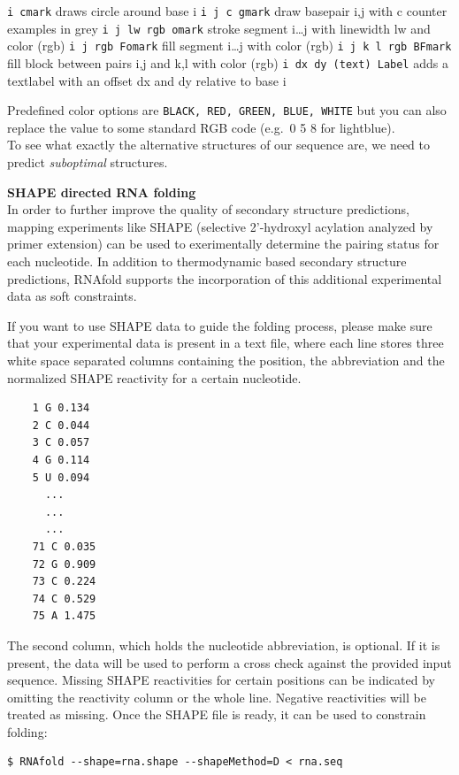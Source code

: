 \documentclass[]{article}
\begin{document}
\texttt{i\ cmark} draws circle around base i \texttt{i\ j\ c\ gmark}
draw basepair i,j with c counter examples in grey
\texttt{i\ j\ lw\ rgb\ omark} stroke segment i\ldots{}j with linewidth
lw and color (rgb) \texttt{i\ j\ rgb\ Fomark} fill segment i\ldots{}j
with color (rgb) \texttt{i\ j\ k\ l\ rgb\ BFmark} fill block between
pairs i,j and k,l with color (rgb) \texttt{i\ dx\ dy\ (text)\ Label}
adds a textlabel with an offset dx and dy relative to base i

Predefined color options are \texttt{BLACK,\ RED,\ GREEN,\ BLUE,\ WHITE}
but you can also replace the value to some standard RGB code (e.g.~0 5 8
for lightblue).\\
 To see what exactly the alternative structures of our sequence are, we
need to predict \emph{suboptimal} structures.

\textbf{SHAPE directed RNA folding}\\
In order to further improve the quality of secondary structure
predictions, mapping experiments like SHAPE (selective 2'-hydroxyl
acylation analyzed by primer extension) can be used to exerimentally
determine the pairing status for each nucleotide. In addition to
thermodynamic based secondary structure predictions, RNAfold supports
the incorporation of this additional experimental data as soft
constraints.

If you want to use SHAPE data to guide the folding process, please make
sure that your experimental data is present in a text file, where each
line stores three white space separated columns containing the position,
the abbreviation and the normalized SHAPE reactivity for a certain
nucleotide.

\begin{verbatim}
    1 G 0.134
    2 C 0.044
    3 C 0.057
    4 G 0.114
    5 U 0.094
      ...
      ...
      ...
    71 C 0.035
    72 G 0.909
    73 C 0.224
    74 C 0.529
    75 A 1.475
\end{verbatim}

The second column, which holds the nucleotide abbreviation, is optional.
If it is present, the data will be used to perform a cross check against
the provided input sequence. Missing SHAPE reactivities for certain
positions can be indicated by omitting the reactivity column or the
whole line. Negative reactivities will be treated as missing. Once the
SHAPE file is ready, it can be used to constrain folding:

\begin{verbatim}
$ RNAfold --shape=rna.shape --shapeMethod=D < rna.seq
\end{verbatim}
\end{document}
